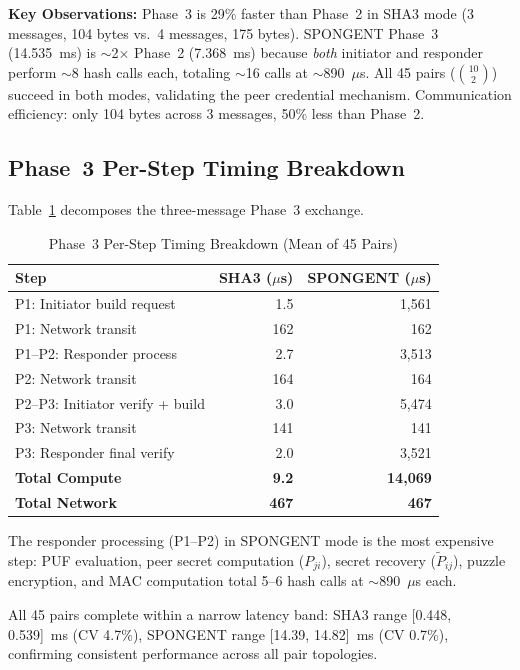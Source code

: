 \documentclass[11pt,a4paper]{article}
\begin{document}
\textbf{Key Observations:} Phase~3 is 29\% faster than Phase~2 in SHA3 mode (3 messages, 104 bytes vs.\ 4 messages, 175 bytes). SPONGENT Phase~3 (14.535~ms) is $\sim$2$\times$ Phase~2 (7.368~ms) because \emph{both} initiator and responder perform $\sim$8 hash calls each, totaling $\sim$16 calls at $\sim$890~$\mu$s. All 45 pairs ($\binom{10}{2}$) succeed in both modes, validating the peer credential mechanism. Communication efficiency: only 104 bytes across 3 messages, 50\% less than Phase~2.

\subsection{Phase~3 Per-Step Timing Breakdown}

Table~\ref{tab:phase3_breakdown} decomposes the three-message Phase~3 exchange.

\begin{table}[H]
\centering
\caption{Phase~3 Per-Step Timing Breakdown (Mean of 45 Pairs)}
\label{tab:phase3_breakdown}
\begin{tabular}{@{}p{5cm}rr@{}}
\toprule
\textbf{Step} & \textbf{SHA3 ($\mu$s)} & \textbf{SPONGENT ($\mu$s)} \\
\midrule
P1: Initiator build request & 1.5 & 1,561 \\
P1: Network transit & 162 & 162 \\
P1--P2: Responder process & 2.7 & 3,513 \\
P2: Network transit & 164 & 164 \\
P2--P3: Initiator verify + build & 3.0 & 5,474 \\
P3: Network transit & 141 & 141 \\
P3: Responder final verify & 2.0 & 3,521 \\
\midrule
\textbf{Total Compute} & \textbf{9.2} & \textbf{14,069} \\
\textbf{Total Network} & \textbf{467} & \textbf{467} \\
\bottomrule
\end{tabular}
\end{table}

The responder processing (P1--P2) in SPONGENT mode is the most expensive step: PUF evaluation, peer secret computation ($P_{ji}$), secret recovery ($\tilde{P}_{ij}$), puzzle encryption, and MAC computation total 5--6 hash calls at $\sim$890~$\mu$s each.

All 45 pairs complete within a narrow latency band: SHA3 range [0.448, 0.539]~ms (CV 4.7\%), SPONGENT range [14.39, 14.82]~ms (CV 0.7\%), confirming consistent performance across all pair topologies.
\end{document}
